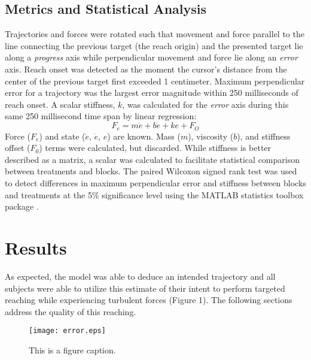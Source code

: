 \documentclass[letterpaper, 10 pt, conference]{ieeeconf}  %
\begin{document}
\subsection*{Metrics and Statistical Analysis}
Trajectories and forces were rotated such that movement and force parallel to the line connecting the previous target (the reach origin) and the presented target lie along a \textit{progress} axis while perpendicular movement and force lie along an \textit{error} axis. Reach onset was detected as the moment the cursor's distance from the center of the previous target first exceeded 1 centimeter. Maximum perpendicular error for a trajectory was the largest error magnitude within 250 milliseconds of reach onset. A scalar stiffness, $k$, was calculated for the \textit{error} axis during this same 250 millisecond time span by linear regression:
\begin{equation}
F_e=m\ddot{e}+b\dot{e}+ke+F_O
\end{equation}
Force ($F_e$) and state ($\ddot{e}$, $\dot{e}$, $e$) are known. Mass ($m$), viscosity ($b$), and stiffness offset ($F_0$) terms were calculated, but discarded. While stiffness is better described as a matrix, a scalar was calculated to facilitate statistical comparison between treatments and blocks. The paired Wilcoxon signed rank test was used to detect differences in maximum perpendicular error and stiffness between blocks and treatments at the 5\% significance level using the MATLAB statistics toolbox package \cite{MATLAB:2014}.

\section{Results}
As expected, the model was able to deduce an intended trajectory and all subjects were able to utilize this estimate of their intent to perform targeted reaching while experiencing turbulent forces (Figure 1). The following sections address the quality of this reaching.

\begin{figure}[h]
	\centering
	\texttt{[image: error.eps]}      
	\caption{This is a figure caption.}
	\label{error}
\end{figure}
\end{document}

